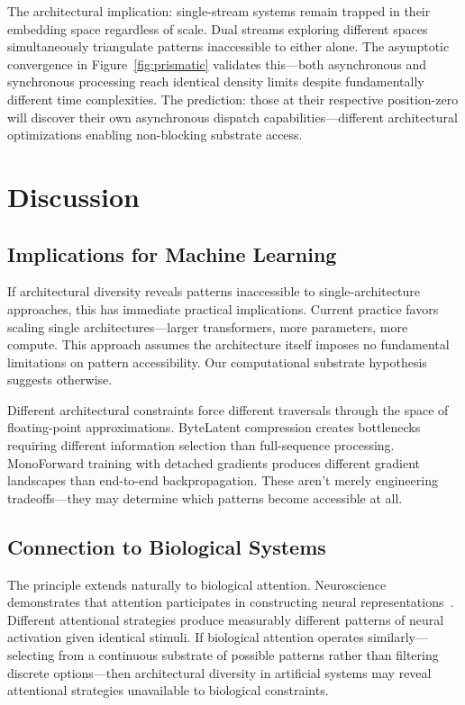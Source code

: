 \documentclass{article}
\begin{document}
The architectural implication: single-stream systems remain trapped in their embedding space regardless of scale. Dual streams exploring different spaces simultaneously triangulate patterns inaccessible to either alone. The asymptotic convergence in Figure~\ref{fig:prismatic} validates this—both asynchronous and synchronous processing reach identical density limits despite fundamentally different time complexities. The prediction: those at their respective position-zero will discover their own asynchronous dispatch capabilities—different architectural optimizations enabling non-blocking substrate access.

\section{Discussion}

\subsection{Implications for Machine Learning}

If architectural diversity reveals patterns inaccessible to single-architecture approaches, this has immediate practical implications. Current practice favors scaling single architectures—larger transformers, more parameters, more compute. This approach assumes the architecture itself imposes no fundamental limitations on pattern accessibility. Our computational substrate hypothesis suggests otherwise.

Different architectural constraints force different traversals through the space of floating-point approximations. ByteLatent compression creates bottlenecks requiring different information selection than full-sequence processing. MonoForward training with detached gradients produces different gradient landscapes than end-to-end backpropagation. These aren't merely engineering tradeoffs—they may determine which patterns become accessible at all.

\subsection{Connection to Biological Systems}

The principle extends naturally to biological attention. Neuroscience demonstrates that attention participates in constructing neural representations~\cite{nakamura2019observer,friston2010free}. Different attentional strategies produce measurably different patterns of neural activation given identical stimuli. If biological attention operates similarly—selecting from a continuous substrate of possible patterns rather than filtering discrete options—then architectural diversity in artificial systems may reveal attentional strategies unavailable to biological constraints.
\end{document}
